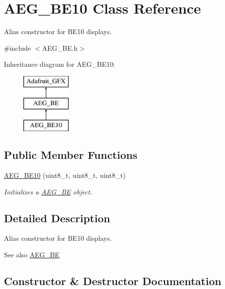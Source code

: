 \hypertarget{class_a_e_g___b_e10}{}\section{A\+E\+G\+\_\+\+B\+E10 Class Reference}
\label{class_a_e_g___b_e10}


Alias constructor for B\+E10 displays.  




{\ttfamily \#include $<$A\+E\+G\+\_\+\+B\+E.\+h$>$}

Inheritance diagram for A\+E\+G\+\_\+\+B\+E10\+:\begin{figure}[H]
\begin{center}
\leavevmode
\includegraphics[height=3.000000cm]{class_a_e_g___b_e10}
\end{center}
\end{figure}
\subsection*{Public Member Functions}
\begin{DoxyCompactItemize}
\item 
\hyperlink{class_a_e_g___b_e10_af406607c342a0afffbc7991e32848552}{A\+E\+G\+\_\+\+B\+E10} (uint8\+\_\+t, uint8\+\_\+t, uint8\+\_\+t)
\begin{DoxyCompactList}\small\item\em Initializes a {\ttfamily \hyperlink{class_a_e_g___b_e}{A\+E\+G\+\_\+\+BE}} object. \end{DoxyCompactList}\end{DoxyCompactItemize}


\subsection{Detailed Description}
Alias constructor for B\+E10 displays. 

\begin{DoxySeeAlso}{See also}
\hyperlink{class_a_e_g___b_e}{A\+E\+G\+\_\+\+BE} 
\end{DoxySeeAlso}


\subsection{Constructor \& Destructor Documentation}
\mbox{\label{class_a_e_g___b_e10_af406607c342a0afffbc7991e32848552}} 
